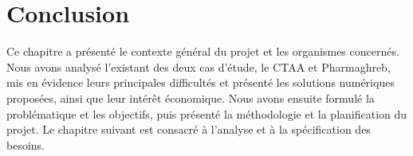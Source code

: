 \section*{Conclusion}

Ce chapitre a présenté le contexte général du projet et les organismes concernés. Nous avons analysé l'existant des deux cas d'étude, le \ac{CTAA} et Pharmaghreb, mis en évidence leurs principales difficultés et présenté les solutions numériques proposées, ainsi que leur intérêt économique. Nous avons ensuite formulé la problématique et les objectifs, puis présenté la méthodologie et la planification du projet. Le chapitre suivant est consacré à l'analyse et à la spécification des besoins.
